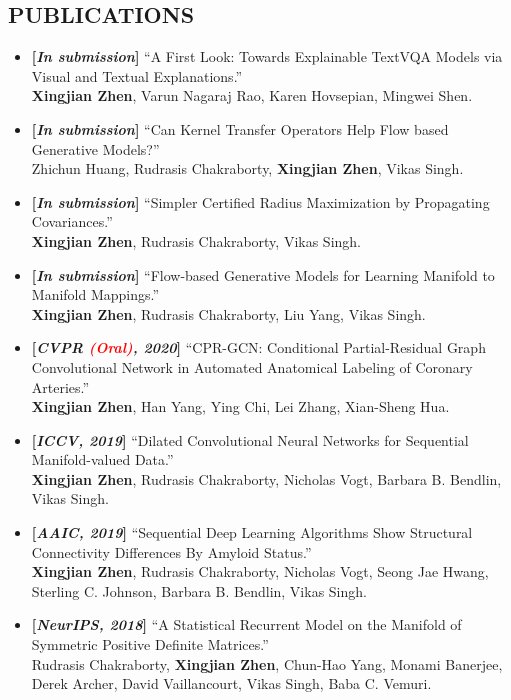 \documentclass[margin]{res}
\begin{document}
\begin{resume}
\section{PUBLICATIONS}
                \begin{itemize}[noitemsep,wide=0pt,leftmargin=\dimexpr{} + 2\relax]\itemsep -0.0pt
                \item \textbf{[\emph{In submission}]} ``A First Look: Towards Explainable TextVQA Models via Visual and Textual Explanations.''\\
                            \textbf{Xingjian Zhen}, Varun Nagaraj Rao, Karen Hovsepian, Mingwei Shen.
                \item \textbf{[\emph{In submission}]} ``Can Kernel Transfer Operators Help Flow based Generative Models?''\\
                            Zhichun Huang, Rudrasis Chakraborty, \textbf{Xingjian Zhen}, Vikas Singh.
                \item \textbf{[\emph{In submission}]} ``Simpler Certified Radius Maximization by Propagating Covariances.''\\
                            \textbf{Xingjian Zhen}, Rudrasis Chakraborty, Vikas Singh.
                \item \textbf{[\emph{In submission}]} ``Flow-based Generative Models for Learning Manifold to Manifold Mappings.''\\
                            \textbf{Xingjian Zhen}, Rudrasis Chakraborty, Liu Yang, Vikas Singh.   
                \item \textbf{[\emph{CVPR \textcolor{red}{(Oral)}, 2020}]} ``CPR-GCN: Conditional Partial-Residual Graph Convolutional Network in Automated Anatomical Labeling of Coronary Arteries.''\\
                            \textbf{Xingjian Zhen}, Han Yang, Ying Chi, Lei Zhang, Xian-Sheng Hua.   
                \item \textbf{[\emph{ICCV, 2019}]} ``Dilated Convolutional Neural Networks for Sequential Manifold-valued Data.'' \\
                             \textbf{Xingjian Zhen}, Rudrasis Chakraborty, Nicholas Vogt, Barbara B. Bendlin, Vikas Singh. 
                \item \textbf{[\emph{AAIC, 2019}]} ``Sequential Deep Learning Algorithms Show Structural Connectivity Differences By Amyloid Status.''\\
                             \textbf{Xingjian Zhen}, Rudrasis Chakraborty, Nicholas Vogt, Seong Jae Hwang, Sterling C. Johnson, Barbara B. Bendlin, Vikas Singh. 
                \item \textbf{[\emph{NeurIPS, 2018}]} ``A Statistical Recurrent Model on the Manifold of Symmetric Positive Definite Matrices.''\\
                             Rudrasis Chakraborty, \textbf{Xingjian Zhen}, Chun-Hao Yang, Monami Banerjee, Derek Archer, David Vaillancourt, Vikas Singh, Baba C. Vemuri.
                \end{itemize}


\end{resume}
\end{document}
